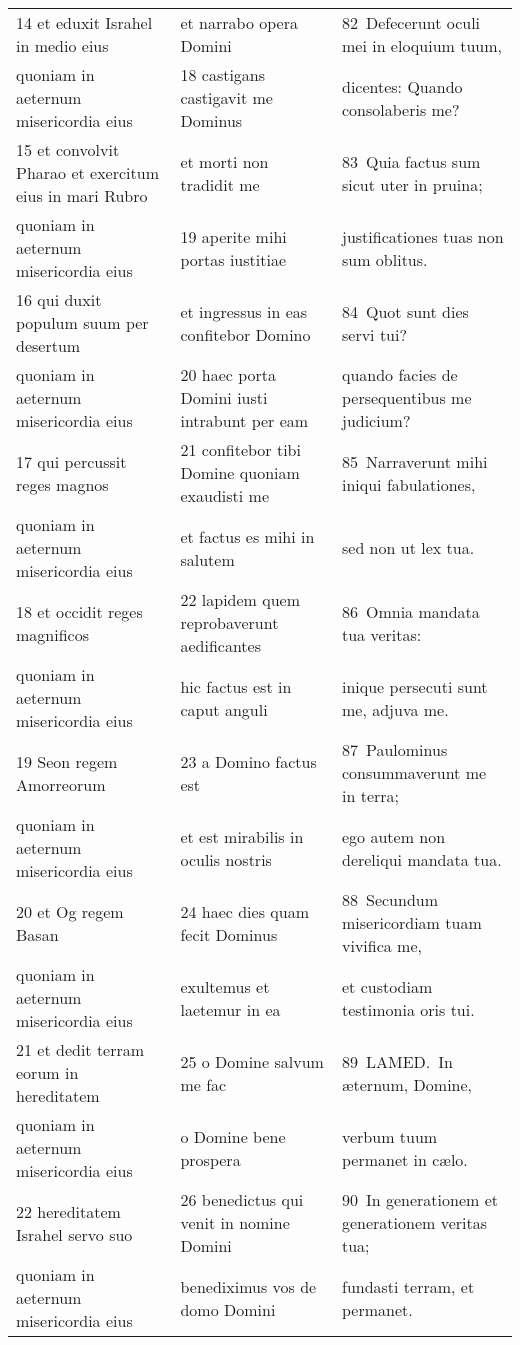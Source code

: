 \documentclass{article}
\begin{document}
\begin{longtable}{@{}p{}p{}p{}@{}}
14 et eduxit Israhel in medio eius	&	et narrabo opera Domini	&	82 Defecerunt oculi mei in eloquium tuum,	\\
quoniam in aeternum misericordia eius	&	18 castigans castigavit me Dominus	&	dicentes: Quando consolaberis me?	\\
15 et convolvit Pharao et exercitum eius in mari Rubro	&	et morti non tradidit me	&	83 Quia factus sum sicut uter in pruina;	\\
quoniam in aeternum misericordia eius	&	19 aperite mihi portas iustitiae	&	justificationes tuas non sum oblitus.	\\
16 qui duxit populum suum per desertum	&	et ingressus in eas confitebor Domino	&	84 Quot sunt dies servi tui?	\\
quoniam in aeternum misericordia eius	&	20 haec porta Domini iusti intrabunt per eam	&	quando facies de persequentibus me judicium?	\\
17 qui percussit reges magnos	&	21 confitebor tibi Domine quoniam exaudisti me	&	85 Narraverunt mihi iniqui fabulationes,	\\
quoniam in aeternum misericordia eius	&	et factus es mihi in salutem	&	sed non ut lex tua.	\\
18 et occidit reges magnificos	&	22 lapidem quem reprobaverunt aedificantes	&	86 Omnia mandata tua veritas:	\\
quoniam in aeternum misericordia eius	&	hic factus est in caput anguli	&	inique persecuti sunt me, adjuva me.	\\
19 Seon regem Amorreorum	&	23 a Domino factus est	&	87 Paulominus consummaverunt me in terra;	\\
quoniam in aeternum misericordia eius	&	et est mirabilis in oculis nostris	&	ego autem non dereliqui mandata tua.	\\
20 et Og regem Basan	&	24 haec dies quam fecit Dominus	&	88 Secundum misericordiam tuam vivifica me,	\\
quoniam in aeternum misericordia eius	&	exultemus et laetemur in ea	&	et custodiam testimonia oris tui.	\\
21 et dedit terram eorum in hereditatem	&	25 o Domine salvum me fac	&	89 LAMED. In æternum, Domine,	\\
quoniam in aeternum misericordia eius	&	o Domine bene prospera	&	verbum tuum permanet in cælo.	\\
22 hereditatem Israhel servo suo	&	26 benedictus qui venit in nomine Domini	&	90 In generationem et generationem veritas tua;	\\
quoniam in aeternum misericordia eius	&	benediximus vos de domo Domini	&	fundasti terram, et permanet.	\\

\end{longtable}
\end{document}
